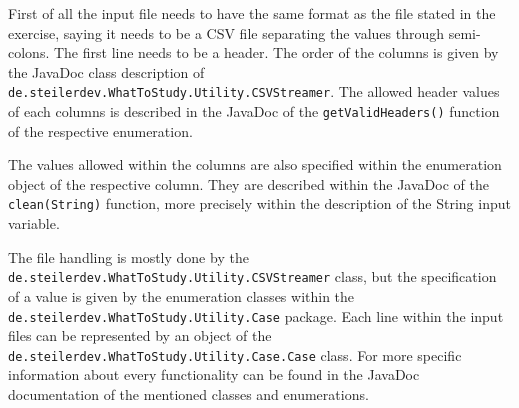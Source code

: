 \documentclass[%
	pdftex,
	oneside,        %
	11pt,           %
	parskip=half,   %
	headsepline,    %
	footsepline,    %
	abstracton,     %
	USenglish,      %
	a4paper,        %
]{report}
\begin{document}
First of all the input file needs to have the same format as the file stated in the exercise, saying it needs to be a CSV file separating the values through semi-colons. The first line needs to be a header. The order of the columns is given by the JavaDoc class description of \texttt{de.\allowbreak steilerdev.\allowbreak WhatToStudy.\allowbreak Utility.\allowbreak CSVStreamer}. The allowed header values of each columns is described in the JavaDoc of the \texttt{getValidHeaders()} function of the respective enumeration.

The values allowed within the columns are also specified within the enumeration object of the respective column. They are described within the JavaDoc of the \texttt{clean(String)} function, more precisely within the description of the String input variable.

The file handling is mostly done by the \texttt{de.\allowbreak steilerdev.\allowbreak WhatToStudy.\allowbreak Utility.\allowbreak CSVStreamer} class, but the specification of a value is given by the enumeration classes within the \texttt{de.\allowbreak steilerdev.\allowbreak WhatToStudy.\allowbreak Utility.\allowbreak Case} package. Each line within the input files can be represented by an object of the \texttt{de.\allowbreak steilerdev.\allowbreak WhatToStudy.\allowbreak Utility.\allowbreak Case.\allowbreak Case} class. For more specific information about every functionality can be found in the JavaDoc documentation of the mentioned classes and enumerations.

\printbibliography

\begin{appendices}
    
    
\end{appendices}
\end{document}
